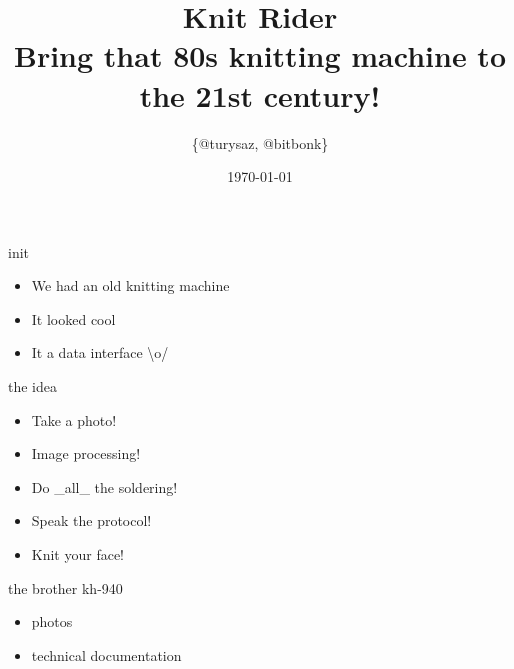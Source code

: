 \documentclass{beamer}
\author{\{@turysaz, @bitbonk\}}
\title{\Huge{Knit Rider}\\
    \large{Bring that 80s knitting machine to the 21st century!}
}
\date{\today{}}
\begin{document}
\maketitle

\begin{frame}{init}
    \begin{itemize}[<+->]
        \item We had an old knitting machine
        \item It looked cool
        \item It  a data interface \textbackslash{}o/
    \end{itemize}
\end{frame}

\begin{frame}{the idea}
    \begin{itemize}[<+->]
        \item Take a photo!
        \item Image processing!
        \item Do \_all\_ the soldering!
        \item Speak the protocol!
        \item Knit your face!
    \end{itemize}
\end{frame}

\begin{frame}{the brother kh-940}
    \begin{itemize}[<+->]
        \item photos
        \item technical documentation
    \end{itemize}
\end{frame}
\end{document}
